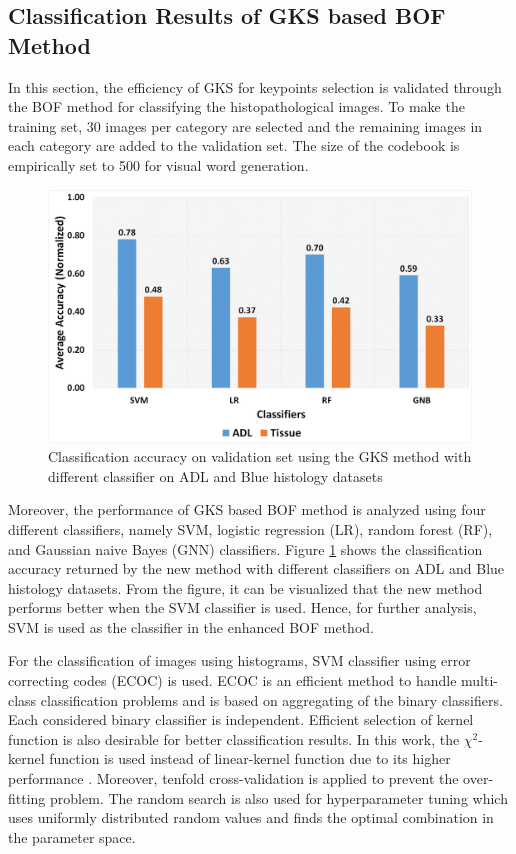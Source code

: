 \subsection{Classification Results of GKS based BOF Method} \label{subsec:2}
In this section, the efficiency of GKS for keypoints selection is validated through the BOF method for classifying the histopathological images. To make the training set, $30$ images per category are selected and the remaining images in each category are added to the validation set.  The size of the codebook is empirically set to 500 for visual word generation. 
\begin{figure}[t]
\centering
\includegraphics[scale=0.25]{SVM}
  \caption[Classification accuracy on validation set using the GKS method with different classifier on ADL and Blue histology datasets]{\fontsize{10}{12}\selectfont Classification accuracy on validation set using the GKS method with different classifier on ADL and Blue histology datasets}\label{ch3:fig:svm}
\end{figure}
Moreover,  the performance of GKS based BOF method is analyzed using four different classifiers, namely SVM, logistic regression (LR), random forest (RF), and Gaussian naive Bayes (GNN) classifiers. Figure \ref{ch3:fig:svm} shows the classification accuracy returned by the new method with different classifiers  on ADL and Blue histology datasets. From the figure, it can be visualized that the new method performs better when the SVM classifier is used. Hence, for further analysis, SVM is used as the classifier in the enhanced BOF method.

 For the classification of images using histograms, SVM classifier using error correcting codes (ECOC) \cite{ali2012} is used. ECOC is an efficient method to handle multi-class classification problems and is based on aggregating of the binary classifiers. Each considered binary classifier is independent. Efficient selection of kernel function is also desirable for better classification results. In this work, the $\chi^2$-kernel function is used instead of linear-kernel function due to its higher performance \cite{jiang2010}.  Moreover, tenfold cross-validation is applied to prevent the over-fitting problem. The random search is also used for hyperparameter tuning which uses uniformly distributed random values and finds the optimal combination in the parameter space.

